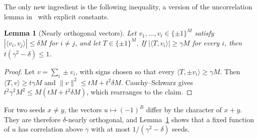 \documentclass[11pt,letterpaper]{article}
\newtheorem{lemma}{Lemma}
\begin{document}
The only new ingredient is the following inequality, a version of the
uncorrelation lemma in~\cite[Section~5]{KW} with explicit constants.

\begin{lemma}[Nearly orthogonal vectors]\label{lem:gram}
Let $v_1,\dots,v_t\in\{\pm1\}^M$ satisfy
$|\langle v_i,v_j\rangle|\le\delta M$ for $i\ne j$, and let
$T\in\{\pm1\}^M$. If $|\langle T,v_i\rangle|\ge\gamma M$ for every $i$, then
$t(\gamma^2-\delta)\le1$.
\end{lemma}
\begin{proof}
Let $v=\sum_i\pm v_i$, with signs chosen so that every
$\langle T,\pm v_i\rangle\ge\gamma M$. Then $\langle T,v\rangle\ge t\gamma M$
and $\|v\|^2\le tM+t^2\delta M$. Cauchy--Schwarz gives
$t^2\gamma^2M^2\le M(tM+t^2\delta M)$, which rearranges to the claim.
\end{proof}

For two seeds $x\ne y$, the vectors $u\mapsto(-1)^{B}$ differ by the
character of $x+y$. They are therefore $\delta$-nearly orthogonal, and
Lemma~\ref{lem:gram} shows that a fixed function of $u$ has correlation above
$\gamma$ with at most $1/(\gamma^2-\delta)$ seeds.
\end{document}
